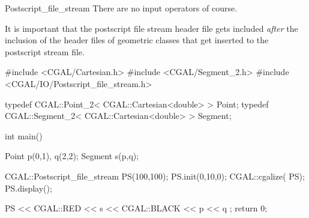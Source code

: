 \begin{ccClass} {Postscript_file_stream}
There are no input operators of course.

\ccExample

It is important that the postscript file stream header file gets included
{\em after} the inclusion of the header files of geometric classes
that get inserted to the postscript stream file.

\begin{cprog}

#include <CGAL/Cartesian.h>
#include <CGAL/Segment_2.h>
#include <CGAL/IO/Postscript_file_stream.h>

typedef CGAL::Point_2< CGAL::Cartesian<double> >     Point;
typedef CGAL::Segment_2< CGAL::Cartesian<double> >   Segment;

int main()
{
    Point p(0,1), q(2,2);
    Segment s(p,q);

    CGAL::Postscript_file_stream PS(100,100);
    PS.init(0,10,0);
    CGAL::cgalize( PS);
    PS.display();

    PS << CGAL::RED << s << CGAL::BLACK << p << q ;
    return 0;
}
\end{cprog} 

\end{ccClass} 
